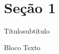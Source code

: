 
\section{Seção 1}

\begin{frame}{Título}{subtítulo}
    \begin{block}{Bloco}
        Texto 
    \end{block}
\end{frame}
